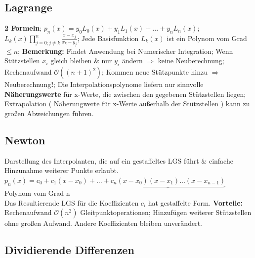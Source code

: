 \subsection{Lagrange}
\textbf{2 Formeln}; 
$ p_{n}(x) = y_{0} L_{0} (x) + y_{1} L_{1} (x)+ ... +y_{n} L_{n} (x) $;
$ L_{k}(x) \prod_{ j = 0;j\neq k }^{n} \frac{ x-x_{j} }{ x_{k} - y_{j} } $; 
Jede Basisfunktion $ L_{k}(x) $ ist ein Polynom vom Grad $ \le n $; 
\textbf{Bemerkung:} Findet Anwendung bei Numerischer Integration; Wenn Stützstellen $ x_{i}  $ gleich bleiben \& nur $ y_{i} $ ändern $ \Rightarrow $ keine Neuberechnung; Rechenaufwand $ \mathcal O ( ( n +1)^{2} ) $; Kommen neue Stützpunkte hinzu $ \Rightarrow $ Neuberechnung\textbf{!}; Die Interpolationspolynome liefern nur sinnvolle \textbf{ Näherungswerte } für x-Werte, die zwischen den gegebenen Stützstellen liegen; Extrapolation ( Näherungwerte für x-Werte außerhalb der Stützstellen ) kann zu großen Abweichungen führen.

\subsection{Newton}
Darstellung des Interpolanten, die auf ein gestaffeltes LGS führt \& einfache Hinzunahme weiterer Punkte erlaubt.
$p_{n}(x) = c_{0} + c_{1} ( x-x_{0} ) + ... + \underbrace {c_{n} ( x-x_{0} ) ( x-x_{1} ) ... ( x-x_{n-1} ) } $\\
Polynom vom Grad n\\
Das Resultierende LGS für die Koeffizienten $ c_{i} $ hat gestaffelte Form.
\textbf{Vorteile:} Rechenaufwand $ \mathcal O ( n^{2} ) $ Gleitpunktoperationen; Hinzufügen weiterer Stützstellen ohne großen Aufwand. Andere Koeffizienten bleiben unverändert.

\subsection{Dividierende Differenzen}